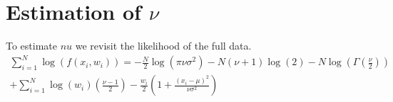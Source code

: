 \documentclass[a4paper, 11 pt]{article}
\begin{document}
\section{Estimation of $\nu$}
To estimate $nu$ we revisit the likelihood of the full data. 
\begin{align*}
    \sum_{i = 1}^N \log\left(f(x_i,w_i)\right) = -\frac{N}{2}\log\left(\pi\nu\sigma^2\right) - N\left(\nu+1\right)\log\left(2\right)-N\log\left(\Gamma\left(\frac{\nu}{2}\right)\right) \\ + \sum_{i = 1}^N \log\left(w_i\right)\left(\frac{\nu-1}{2}\right)-\frac{w_i}{2}\left(1+\frac{(x_i-\mu)^2}{\nu\sigma^2}\right)      
\end{align*}
\end{document}
